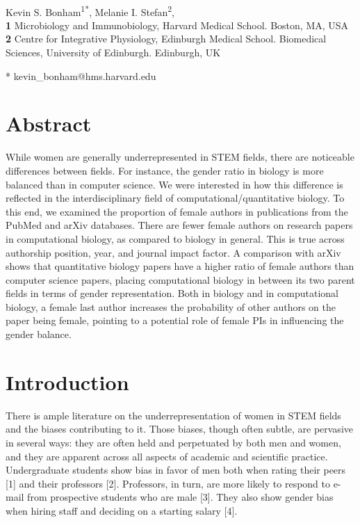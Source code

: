 \documentclass[10pt,letterpaper]{article}
\date{}
\begin{document}
\vspace*{0.2in}

\begin{flushleft}
{\Large
\textbf{}
}
\newline
\\
Kevin S. Bonham\textsuperscript{1*},
Melanie I. Stefan\textsuperscript{2},
\\
\bigskip
\textbf{1} Microbiology and Immunobiology, Harvard Medical School. Boston, MA, USA
\\
\textbf{2} {Centre for Integrative Physiology, Edinburgh Medical School. Biomedical Sciences, University of Edinburgh. Edinburgh, UK}
\\
\bigskip

* kevin_bonham@hms.harvard.edu

\section*{Abstract}
While women are generally underrepresented in STEM fields, there are noticeable differences between fields. For instance, the gender ratio in biology is more balanced than in computer science. We were interested in how this difference is reflected in the interdisciplinary field of computational/quantitative biology. To this end, we examined the proportion of female authors in publications from the PubMed and arXiv databases. There are fewer female authors on research papers in computational biology, as compared to biology in general. This is true across authorship position, year, and journal impact factor. A comparison with arXiv shows that quantitative biology papers have a higher ratio of female authors than computer science papers, placing computational biology in between its two parent fields in terms of gender representation. Both in biology and in computational biology, a female last author increases the probability of other authors on the paper being female, pointing to a potential role of female PIs in influencing the gender balance.

\section*{Introduction}
There is ample literature on the underrepresentation of women in STEM fields and the biases contributing to it. Those biases, though often subtle, are pervasive in several ways: they are often held and perpetuated by both men and women, and they are apparent across all aspects of academic and scientific practice. Undergraduate students show bias in favor of men both when rating their peers [1] and their professors [2]. Professors, in turn, are more likely to respond to e-mail from prospective students who are male [3]. They also show gender bias when hiring staff and deciding on a starting salary [4].


\end{flushleft}
\end{document}
